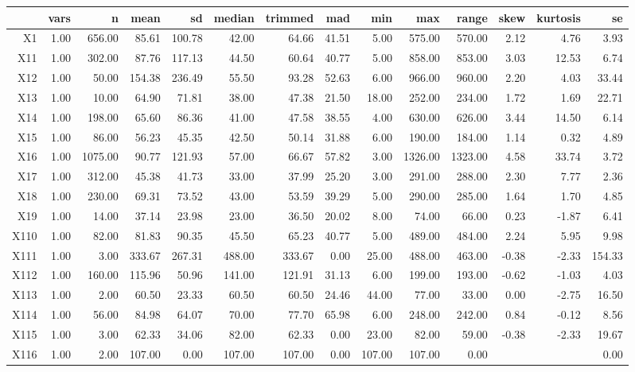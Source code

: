 % 
\begin{tabular}{rrrrrrrrrrrrrr}
  \hline
 & vars & n & mean & sd & median & trimmed & mad & min & max & range & skew & kurtosis & se \\ 
  \hline
X1 & 1.00 & 656.00 & 85.61 & 100.78 & 42.00 & 64.66 & 41.51 & 5.00 & 575.00 & 570.00 & 2.12 & 4.76 & 3.93 \\ 
  X11 & 1.00 & 302.00 & 87.76 & 117.13 & 44.50 & 60.64 & 40.77 & 5.00 & 858.00 & 853.00 & 3.03 & 12.53 & 6.74 \\ 
  X12 & 1.00 & 50.00 & 154.38 & 236.49 & 55.50 & 93.28 & 52.63 & 6.00 & 966.00 & 960.00 & 2.20 & 4.03 & 33.44 \\ 
  X13 & 1.00 & 10.00 & 64.90 & 71.81 & 38.00 & 47.38 & 21.50 & 18.00 & 252.00 & 234.00 & 1.72 & 1.69 & 22.71 \\ 
  X14 & 1.00 & 198.00 & 65.60 & 86.36 & 41.00 & 47.58 & 38.55 & 4.00 & 630.00 & 626.00 & 3.44 & 14.50 & 6.14 \\ 
  X15 & 1.00 & 86.00 & 56.23 & 45.35 & 42.50 & 50.14 & 31.88 & 6.00 & 190.00 & 184.00 & 1.14 & 0.32 & 4.89 \\ 
  X16 & 1.00 & 1075.00 & 90.77 & 121.93 & 57.00 & 66.67 & 57.82 & 3.00 & 1326.00 & 1323.00 & 4.58 & 33.74 & 3.72 \\ 
  X17 & 1.00 & 312.00 & 45.38 & 41.73 & 33.00 & 37.99 & 25.20 & 3.00 & 291.00 & 288.00 & 2.30 & 7.77 & 2.36 \\ 
  X18 & 1.00 & 230.00 & 69.31 & 73.52 & 43.00 & 53.59 & 39.29 & 5.00 & 290.00 & 285.00 & 1.64 & 1.70 & 4.85 \\ 
  X19 & 1.00 & 14.00 & 37.14 & 23.98 & 23.00 & 36.50 & 20.02 & 8.00 & 74.00 & 66.00 & 0.23 & -1.87 & 6.41 \\ 
  X110 & 1.00 & 82.00 & 81.83 & 90.35 & 45.50 & 65.23 & 40.77 & 5.00 & 489.00 & 484.00 & 2.24 & 5.95 & 9.98 \\ 
  X111 & 1.00 & 3.00 & 333.67 & 267.31 & 488.00 & 333.67 & 0.00 & 25.00 & 488.00 & 463.00 & -0.38 & -2.33 & 154.33 \\ 
  X112 & 1.00 & 160.00 & 115.96 & 50.96 & 141.00 & 121.91 & 31.13 & 6.00 & 199.00 & 193.00 & -0.62 & -1.03 & 4.03 \\ 
  X113 & 1.00 & 2.00 & 60.50 & 23.33 & 60.50 & 60.50 & 24.46 & 44.00 & 77.00 & 33.00 & 0.00 & -2.75 & 16.50 \\ 
  X114 & 1.00 & 56.00 & 84.98 & 64.07 & 70.00 & 77.70 & 65.98 & 6.00 & 248.00 & 242.00 & 0.84 & -0.12 & 8.56 \\ 
  X115 & 1.00 & 3.00 & 62.33 & 34.06 & 82.00 & 62.33 & 0.00 & 23.00 & 82.00 & 59.00 & -0.38 & -2.33 & 19.67 \\ 
  X116 & 1.00 & 2.00 & 107.00 & 0.00 & 107.00 & 107.00 & 0.00 & 107.00 & 107.00 & 0.00 &  &  & 0.00 \\ 
   \hline
\end{tabular}

